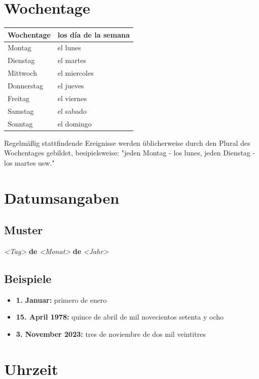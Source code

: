 \documentclass[10pt,spanish]{report}
\begin{document}
\section*{Wochentage}
\begin{longtable}{p{} | p{}} 
\textbf{Wochentage}     & \textbf{los día de la semana}                                       \\ \hline
\hline
\endhead %
Montag & el lunes \\
Dienstag & el martes\\
Mittwoch & el miercoles \\
Donnerstag & el jueves \\
Freitag & el viernes\\
Samstag & el sabado \\
Sonntag & el domingo \\
\end{longtable}
Regelmäßig stattfindende Ereignisse werden üblicherweise durch den Plural des Wochentages gebildet, besipielsweise: "jeden Montag - los lunes, jeden Dienstag - los martes usw."
\newpage

\section*{Datumsangaben}
\subsection*{Muster}
\textit{<Tag>} \textbf{de} \textit{<Monat>} \textbf{de} \textit{<Jahr> }

\subsection*{Beispiele}
\begin{itemize}
  \item \textbf{1. Januar: } primero de enero
  \item \textbf{15. April 1978: } quince de abril de mil novecientos setenta y ocho
  \item \textbf{3. November 2023: } tres de noviembre de dos mil veintitres
\end{itemize}

\section*{Uhrzeit}
\end{document}
